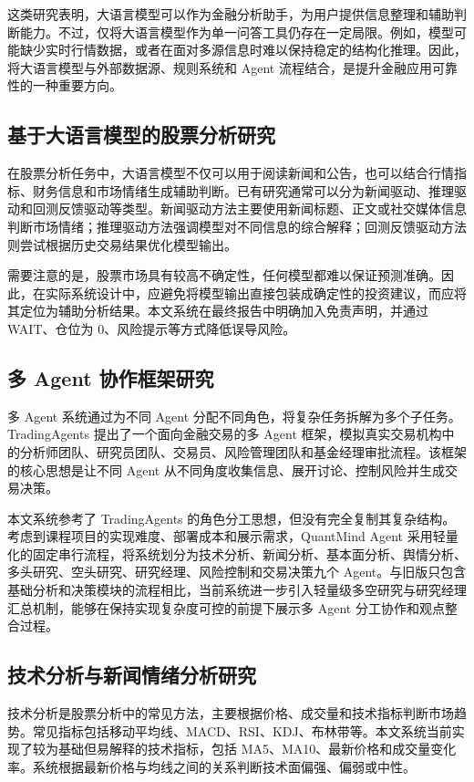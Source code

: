 \documentclass[UTF8,a4paper,12pt]{ctexart}
\begin{document}
这类研究表明，大语言模型可以作为金融分析助手，为用户提供信息整理和辅助判断能力。不过，仅将大语言模型作为单一问答工具仍存在一定局限。例如，模型可能缺少实时行情数据，或者在面对多源信息时难以保持稳定的结构化推理。因此，将大语言模型与外部数据源、规则系统和 Agent 流程结合，是提升金融应用可靠性的一种重要方向。

\subsection{基于大语言模型的股票分析研究}

在股票分析任务中，大语言模型不仅可以用于阅读新闻和公告，也可以结合行情指标、财务信息和市场情绪生成辅助判断。已有研究通常可以分为新闻驱动、推理驱动和回测反馈驱动等类型。新闻驱动方法主要使用新闻标题、正文或社交媒体信息判断市场情绪；推理驱动方法强调模型对不同信息的综合解释；回测反馈驱动方法则尝试根据历史交易结果优化模型输出。

需要注意的是，股票市场具有较高不确定性，任何模型都难以保证预测准确。因此，在实际系统设计中，应避免将模型输出直接包装成确定性的投资建议，而应将其定位为辅助分析结果。本文系统在最终报告中明确加入免责声明，并通过 WAIT、仓位为 0、风险提示等方式降低误导风险。

\subsection{多 Agent 协作框架研究}

多 Agent 系统通过为不同 Agent 分配不同角色，将复杂任务拆解为多个子任务。TradingAgents 提出了一个面向金融交易的多 Agent 框架，模拟真实交易机构中的分析师团队、研究员团队、交易员、风险管理团队和基金经理审批流程。该框架的核心思想是让不同 Agent 从不同角度收集信息、展开讨论、控制风险并生成交易决策。

本文系统参考了 TradingAgents 的角色分工思想，但没有完全复制其复杂结构。考虑到课程项目的实现难度、部署成本和展示需求，QuantMind Agent 采用轻量化的固定串行流程，将系统划分为技术分析、新闻分析、基本面分析、舆情分析、多头研究、空头研究、研究经理、风险控制和交易决策九个 Agent。与旧版只包含基础分析和决策模块的流程相比，当前系统进一步引入轻量级多空研究与研究经理汇总机制，能够在保持实现复杂度可控的前提下展示多 Agent 分工协作和观点整合过程。

\subsection{技术分析与新闻情绪分析研究}

技术分析是股票分析中的常见方法，主要根据价格、成交量和技术指标判断市场趋势。常见指标包括移动平均线、MACD、RSI、KDJ、布林带等。本文系统当前实现了较为基础但易解释的技术指标，包括 MA5、MA10、最新价格和成交量变化率。系统根据最新价格与均线之间的关系判断技术面偏强、偏弱或中性。
\end{document}
